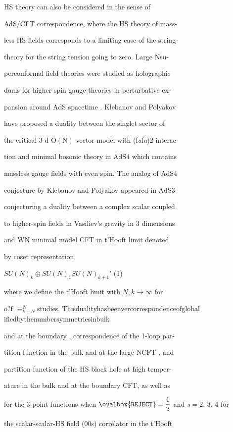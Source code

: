 \documentclass[a4paper,12pt]{article}
\begin{document}
HS theory can also be considered in the sense of

AdS/CFT correspondence, where the HS theory of mass-

less HS fields corresponds to a limiting case of the string

theory for the string tension going to zero. Large Nsu-

perconformal field theories were studied as holographic

duals for higher spin gauge theories in perturbative ex-

pansion around $\mathrm{A}\mathrm{d}\mathrm{S}$ spacetime . Klebanov and Polyakov

have proposed a duality between the singlet sector of

the critical 3-d $\mathrm{O}(\mathrm{N})$ vector model with (f{\it a}f{\it a})2 interac-

tion and minimal bosonic theory in $\mathrm{A}\mathrm{d}\mathrm{S}4$ which contains

massless gauge fields with even spin. The analog of AdS4

conjecture by Klebanov and Polyakov appeared in $\mathrm{A}\mathrm{d}\mathrm{S}3$

conjecturing a duality between a complex scalar coupled

to higher-spin fields in Vasiliev’s gravity in 3 dimensions

and WN minimal model CFT in t’Hooft limit denoted

by coset representation
\begin{center}
$SU(N)_{k}\oplus SU(N)_{1}SU(N)_{k+1}$'   (1)
\end{center}
where we define the t’Hooft limit with $N, k \rightarrow \infty$ for

o?f $\equiv_{k+N}^{N}$studies, Thisdualityhasbeenvercorrespondenceofglobal ifiedbythenumbersymmetriesinbulk

and at the boundary , correspondence of the 1-loop par-

tition function in the bulk and at the large NCFT , and

partition function of the HS black hole at high temper-

ature in the bulk and at the boundary CFT, as well as

for the 3-point functions when $\ovalbox{\tt\small REJECT}= \displaystyle \frac{1}{2}$ and $s=2$, 3, 4 for

the scalar-scalar-HS field (00s) correlator in the t’Hooft
\end{document}

